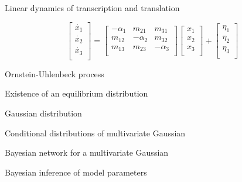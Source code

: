 \documentclass[aspectratio=1610]{beamer}					%
\begin{document}
\begin{frame}{Linear dynamics of transcription and translation}
\begin{textblock*}{15cm}
\begin{equation*}
\begin{bmatrix} 
    \dot{x_{1}}\\
	\dot{x_{2}}\\
	\dot{x_{3}}\\
    \end{bmatrix}
    =
\begin{bmatrix} 
    -\alpha_{1} & m_{21} & m_{31} \\
	m_{12} & -\alpha_{2} & m_{32}\\
	m_{13} & m_{23} & -\alpha_{3} \\
\end{bmatrix}
\begin{bmatrix} 
    x_{1}\\
	x_{2}\\
	x_{3}\\
    \end{bmatrix}
+ 
\begin{bmatrix} 
    \eta_{1}\\
	\eta_{2}\\
	\eta_{3}\\
    \end{bmatrix}
\end{equation*}

\end{textblock*}

\end{frame}

\begin{frame}{Ornstein-Uhlenbeck process}

Existence of an equilibrium distribution

Gaussian distribution

Conditional distributions of multivariate Gaussian

\end{frame}

\begin{frame}{Bayesian network for a multivariate Gaussian}
\end{frame}

\begin{frame}{Bayesian inference of model parameters}
\end{frame}
\end{document}
